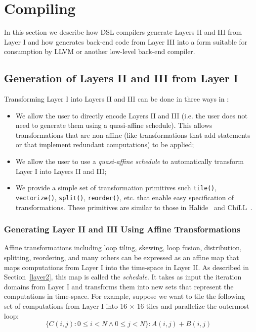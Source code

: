 
\section{\label{sec:compilation}Compiling \framework}

In this section we describe how DSL compilers generate Layers II and III from Layer I and how \framework{} generates back-end code from Layer III into a form suitable for consumption by LLVM or another low-level back-end compiler.
\subsection{Generation of Layers II and III from Layer I}

Transforming Layer I into Layers II and III can be done in three ways in \framework:
\begin{itemize}
    \item We allow the user to directly encode Layers II and III (i.e. the user does not need to generate them using a quasi-affine schedule).  This allows transformations that are non-affine (like transformations that add statements or that implement redundant computations) to be applied;
    \item We allow the user to use a \emph{quasi-affine schedule} to automatically transform Layer I into Layers II and III;
    \item We provide a simple set of transformation primitives such \lstinline{tile()}, \lstinline{vectorize()}, \lstinline{split()}, \lstinline{reorder()}, etc. that enable easy specification of transformations.  These primitives are similar to those in Halide~\cite{halide_12} and ChiLL~\cite{chill}.
\end{itemize}




\subsubsection{Generating Layer II and III Using Affine Transformations}
Affine transformations including loop tiling, skewing, loop fusion, distribution, splitting, reordering, and many others  can be expressed as an affine map that maps computations from Layer I into the time-\processor space in Layer II.  As described in Section~\ref{layer2}, this map is called the \emph{schedule}.  It takes as input the iteration domains from Layer I and transforms them into new sets that represent the computations in time-\processor space.
For example, suppose we want to tile the following set of computations from Layer I into 16 $\times$ 16 tiles and parallelize the outermost loop:
$$\{C(i,j):  0\leq i < N \wedge 0\leq j < N \}: A(i,j) + B(i,j)$$

